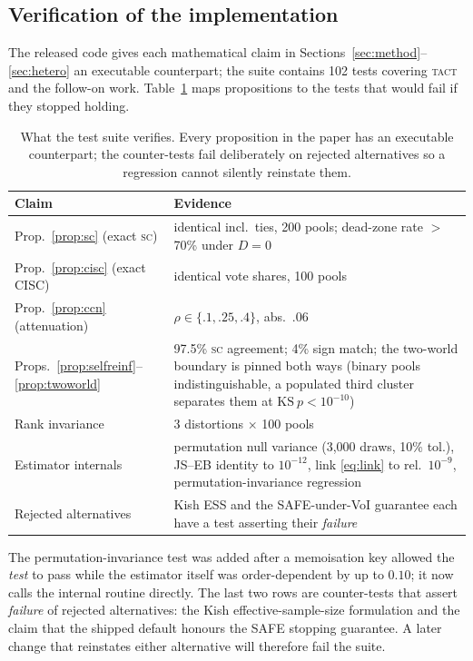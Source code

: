 \documentclass[conference]{IEEEtran}
\newcommand{\SC}{\textsc{sc}}
\newcommand{\TACT}{\textsc{tact}}
\begin{document}
\subsection{Verification of the implementation}\label{sec:tests}
The released code gives each mathematical claim in
Sections~\ref{sec:method}--\ref{sec:hetero} an executable counterpart; the suite
contains 102 tests covering \TACT{} and the
follow-on work. Table~\ref{tab:tests}
maps propositions to the tests that would fail if they stopped holding.

\begin{table}[t]
\centering
\caption{What the test suite verifies. Every proposition in the paper has an
executable counterpart; the counter-tests fail deliberately on rejected
alternatives so a regression cannot silently reinstate them.}
\label{tab:tests}
\setlength{\tabcolsep}{3.4pt}
\begin{tabular}{p{3.0cm} p{4.8cm}}
\toprule
Claim & Evidence \\
\midrule
Prop.~\ref{prop:sc} (exact \SC) & identical incl.\ ties, 200 pools; dead-zone rate $>$70\% under $D{=}0$ \\
Prop.~\ref{prop:cisc} (exact CISC) & identical vote shares, 100 pools \\
Prop.~\ref{prop:ccn} (attenuation) & $\rho\in\{.1,.25,.4\}$, abs.\ $.06$ \\
Props.~\ref{prop:selfreinf}--\ref{prop:twoworld} & 97.5\% \SC{} agreement; 4\% sign match; the two-world boundary is pinned both ways (binary pools indistinguishable, a populated third cluster separates them at $\mathrm{KS}\ p<10^{-10}$) \\
Rank invariance & 3 distortions $\times$ 100 pools \\
Estimator internals & permutation null variance (3{,}000 draws, 10\% tol.), JS--EB identity to $10^{-12}$, link \eqref{eq:link} to rel.\ $10^{-9}$, permutation-invariance regression \\
Rejected alternatives & Kish ESS and the SAFE-under-VoI guarantee each have a test asserting their \emph{failure} \\
\bottomrule
\end{tabular}
\end{table}

The permutation-invariance test was added after a memoisation key allowed the
\emph{test} to pass while the
estimator itself was order-dependent by up to $0.10$; it now calls the internal
routine directly. The last two rows are counter-tests that assert
\emph{failure} of rejected alternatives: the Kish effective-sample-size
formulation and the claim that the shipped default honours the SAFE stopping
guarantee. A later change that reinstates either alternative will therefore fail
the suite.
\end{document}

